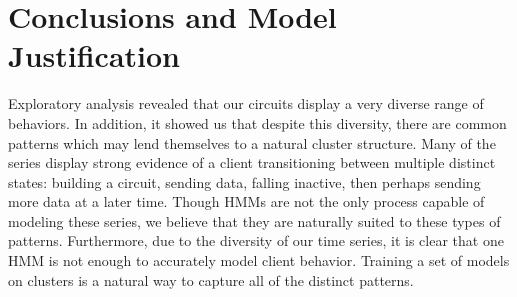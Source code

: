 \section{Conclusions and Model Justification}
Exploratory analysis revealed that our circuits display a very diverse range of behaviors. In addition, it showed us that despite this diversity, there are common patterns which may lend themselves to a natural cluster structure. Many of the series display strong evidence of a client transitioning between multiple distinct states: building a circuit, sending data, falling inactive, then perhaps sending more data at a later time. Though HMMs are not the only process capable of modeling these series, we believe that they are naturally suited to these types of patterns. Furthermore, due to the diversity  of our time series, it is clear that one HMM is not enough to accurately model client behavior. Training a set of models on clusters is a natural way to capture all of the distinct patterns.
